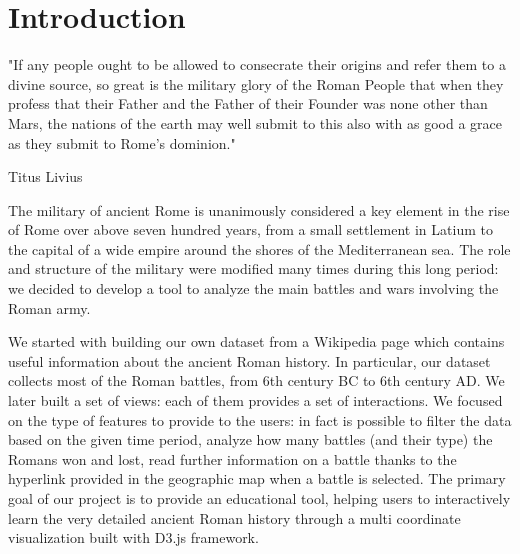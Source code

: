 \section{Introduction}
\begin{displayquote}
    "If any people ought to be allowed to consecrate their origins and refer them to a divine source, so great is the military glory of the Roman People that when they profess that their Father and the Father of their Founder was none other than Mars, the nations of the earth may well submit to this also with as good a grace as they submit to Rome's dominion."
    \begin{flushright}
        Titus Livius
    \end{flushright}
\end{displayquote}

The military of ancient Rome is unanimously considered a key element in the rise of Rome over above seven hundred years, from a small settlement in Latium to the capital of a wide empire around the shores of the Mediterranean sea. The role and structure of the military were modified many times during this long period: we decided to develop a tool to analyze the main battles and wars involving the Roman army.

We started with building our own dataset from a Wikipedia page which contains useful information about the ancient Roman history. In particular, our dataset collects most of the Roman battles, from 6th century BC to 6th century AD. We later built a set of views: each of them provides a set of interactions. We focused on the type of features to provide to the users: in fact is possible to filter the data based on the given time period, analyze how many battles (and their type) the Romans won and lost, read further information on a battle thanks to the hyperlink provided in the geographic map when a battle is selected. The primary goal of our project is to provide an educational tool, helping users to interactively learn the very detailed ancient Roman history through a multi coordinate visualization built with D3.js framework.
